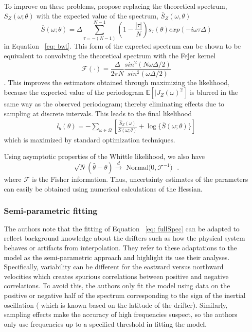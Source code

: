\documentclass{stat572Style}
\begin{document}
To improve on these problems, \citep{Sykulski2013} propose replacing the theoretical spectrum, $S_{Z}(\omega; \theta)$ with the expected value of the spectrum, $\overline{S}_{Z}(\omega, \theta)$\begin{equation}
\overline{S}(\omega; \theta) = \Delta \sum_{\tau = - (N - 1)}^{N-1} \left(1 - \frac{|\tau|}{N} \right)s_{\tau}(\theta) exp ( - i \omega \tau \Delta)
\end{equation}
in Equation ~\ref{eq: bwl}. 
This form of the expected spectrum can be shown to be equivalent to convolving the theoretical spectrum with the Fe\'{j}er kernel 
\begin{equation}
\mathcal{F}(\cdot) = \frac{\Delta}{2\pi N} \frac{sin^{2}(N \omega \Delta/2)}{sin^{2}(\omega \Delta /2)} 
\end{equation} \citep{Sykulski2013}. 
This improves the estimators obtained through maximizing the likelihood, because the expected value of the periodogram $\mathbb{E}[|J_{Z}(\omega)^{2}]$ is blurred in the same way as the observed periodogram; thereby eliminating effects due to sampling at discrete intervals. 
This leads to the final likelihood
\begin{align}
l_{b}(\theta) = - \sum_{\omega \in \Omega} \left[\frac{\hat{S}_{Z}(\omega)}{\overline{S}(\omega; \theta)} + \log \{ \overline{S} (\omega; \theta) \}\right]
\end{align}
which is maximized by standard optimization techniques. 

Using asymptotic properties of the Whittle likelihood, we also have 
\begin{equation}
\label{eq: fisher}
\sqrt{N}(\hat{\theta} - \theta) \overset{d}{\rightarrow} \text{ Normal($0, \mathcal{F}^{-1})$ }.
\end{equation}
where $\mathcal{F}$ is the Fisher information. 
Thus, uncertainty estimates of the parameters can easily be obtained using numerical calculations of the Hessian. 

\subsubsection{Semi-parametric fitting}
The authors note that the fitting of Equation ~\ref{eq: fullSpec} can be adapted to reflect background knowledge about the drifters such as how the physical system behaves or artifacts from interpolation. 
They refer to these adaptations to the model as the semi-parametric approach and highlight its use  their analyses. 
Specifically,  variability can be different for the eastward versus northward velocities  which creates spurious correlations between positive and negative correlations. 
To avoid this, the authors only fit the model using data on the positive or negative half of the spectrum corresponding to the sign of the inertial oscillation ( which is known based on the latitude of the drifter).  
Similarly, sampling effects make the accuracy of high frequencies suspect, so the authors only use frequencies up to a specified threshold in fitting the model. 
\end{document}

